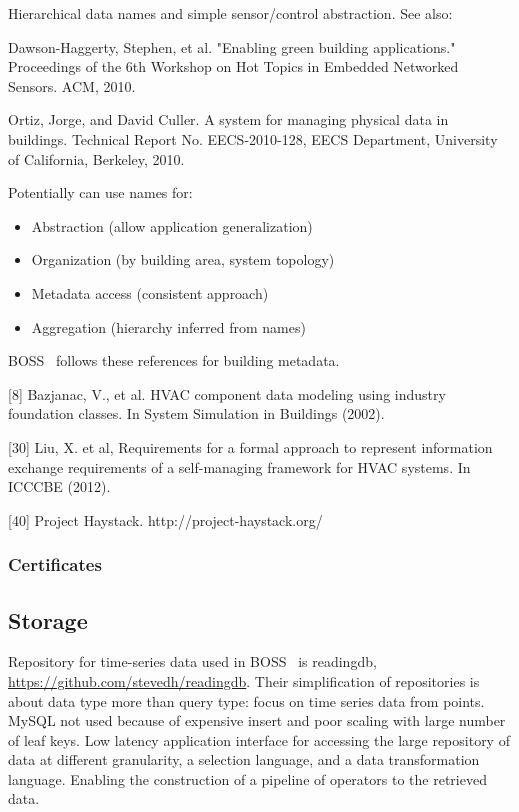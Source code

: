 Hierarchical data names and simple sensor/control abstraction.
See also: 

Dawson-Haggerty, Stephen, et al. "Enabling green building applications." Proceedings of the 6th Workshop on Hot Topics in Embedded Networked Sensors. ACM, 2010.

Ortiz, Jorge, and David Culler. A system for managing physical data in buildings. Technical Report No. EECS-2010-128, EECS Department, University of California, Berkeley, 2010.

Potentially can use names for:
\begin{itemize}
\item Abstraction (allow application generalization)
\item Organization (by building area, system topology) 
\item Metadata access (consistent approach)
\item Aggregation (hierarchy inferred from names) 
\end{itemize} 



BOSS~\cite{Dawson-Haggerty2013BOSS} follows these references for building metadata. 

[8] Bazjanac, V., et al. HVAC component data modeling using industry foundation classes. In System Simulation in Buildings (2002). 

[30] Liu, X. et al, Requirements for a formal approach to represent information exchange requirements of a self-managing framework for HVAC systems. In ICCCBE (2012). 

[40] Project Haystack. http://project-haystack.org/  


\subsubsection{Certificates}

\subsection{Storage}

Repository for time-series data used in BOSS~\cite{Dawson-Haggerty2013BOSS} is readingdb, \url{https://github.com/stevedh/readingdb}.
Their simplification of repositories is about data type more than query type:  focus on time series data from points. 
MySQL not used because of expensive insert and poor scaling with large number of leaf keys.
Low latency application interface for accessing the large repository of data at different granularity, a selection language, and a data transformation language. Enabling the construction of a pipeline of operators to the retrieved data. 

